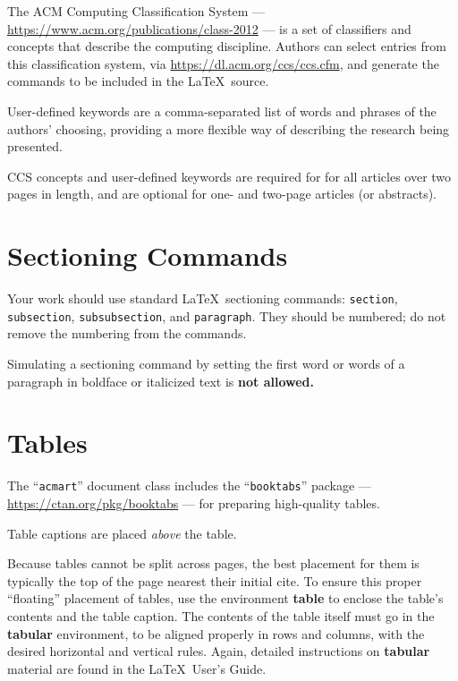 \documentclass[manuscript,screen,review]{acmart}
\begin{document}
The ACM Computing Classification System ---
\url{https://www.acm.org/publications/class-2012} --- is a set of
classifiers and concepts that describe the computing discipline. Authors
can select entries from this classification system, via
\url{https://dl.acm.org/ccs/ccs.cfm}, and generate the commands to be
included in the \LaTeX~source.

User-defined keywords are a comma-separated list of words and phrases of
the authors' choosing, providing a more flexible way of describing the
research being presented.

CCS concepts and user-defined keywords are required for for all articles
over two pages in length, and are optional for one- and two-page
articles (or abstracts).

\hypertarget{sectioning-commands}{%
\section{Sectioning Commands}\label{sectioning-commands}}

Your work should use standard \LaTeX~sectioning commands:
\texttt{section}, \texttt{subsection}, \texttt{subsubsection}, and
\texttt{paragraph}. They should be numbered; do not remove the numbering
from the commands.

Simulating a sectioning command by setting the first word or words of a
paragraph in boldface or italicized text is \textbf{not allowed.}

\hypertarget{tables}{%
\section{Tables}\label{tables}}

The ``\texttt{acmart}'' document class includes the
``\texttt{booktabs}'' package --- \url{https://ctan.org/pkg/booktabs}
--- for preparing high-quality tables.

Table captions are placed \emph{above} the table.

Because tables cannot be split across pages, the best placement for them
is typically the top of the page nearest their initial cite. To ensure
this proper ``floating'' placement of tables, use the environment
\textbf{table} to enclose the table's contents and the table caption.
The contents of the table itself must go in the \textbf{tabular}
environment, to be aligned properly in rows and columns, with the
desired horizontal and vertical rules. Again, detailed instructions on
\textbf{tabular} material are found in the \LaTeX~User's Guide.
\end{document}
